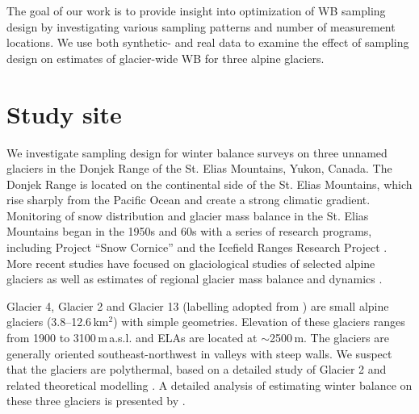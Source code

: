 \documentclass[twocolumn,letterpaper]{igs}
\begin{document}
The goal of our work is to provide insight into optimization of WB sampling design by investigating various sampling patterns and number of measurement locations. We use both synthetic- and real data to examine the effect of sampling design on estimates of glacier-wide WB for three alpine glaciers. 




\section{Study site}

We investigate sampling design for winter balance surveys on three unnamed glaciers in the Donjek Range of the St. Elias Mountains, Yukon, Canada. The Donjek Range is located on the continental side of the St. Elias Mountains, which rise sharply from the Pacific Ocean and create a strong climatic gradient. Monitoring of snow distribution and glacier mass balance in the St. Elias Mountains began in the 1950s and 60s with a series of research programs, including Project ``Snow Cornice''  and the Icefield Ranges Research Project \citep{Wood1948, Danby2003}. More recent studies have focused on glaciological studies of selected alpine glaciers \citep[e.g.][]{Clarke2014} as well as estimates of regional glacier mass balance and dynamics \citep[e.g.][]{Arendt2008, Burgess2013,Waechter2015}. 

Glacier 4, Glacier 2 and Glacier 13 (labelling adopted from \cite{Crompton2016}) are small alpine glaciers (3.8--12.6\,km$^2$) with simple geometries. Elevation of these glaciers ranges from 1900 to 3100\,m\,a.s.l. and ELAs are located at $\sim$2500\,m. The glaciers are generally oriented southeast-northwest in valleys with steep walls. We suspect that the glaciers are polythermal, based on a detailed study of Glacier 2 \citep{Wilson2013} and related theoretical modelling \citep{Wilson2013a}. A detailed analysis of estimating winter balance on these three glaciers is presented by \cite{Pulwicki2017}.

\end{document}
